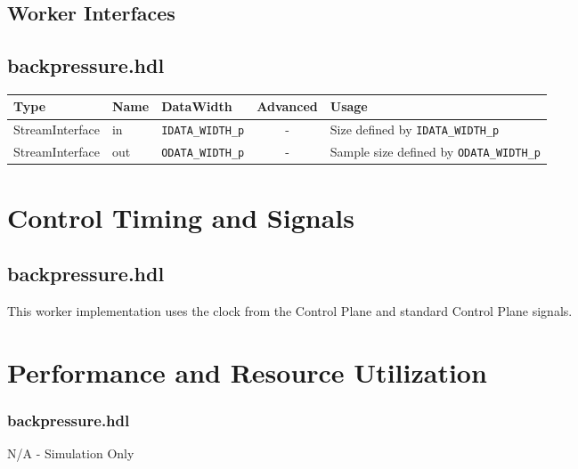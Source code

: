 \documentclass{article}
\def\comp{backpressure}
\begin{document}
\begin{landscape}
	\section*{Worker Interfaces}
	\subsection*{\comp.hdl}
	\begin{scriptsize}
		\begin{tabular}{|M{2cm}|M{1.5cm}|M{4cm}|c|M{12cm}|}
			\hline
			Type            & Name & DataWidth            & Advanced & Usage                                       \\
			\hline
			StreamInterface & in   & \verb+IDATA_WIDTH_p+ & -        & Size defined by \verb+IDATA_WIDTH_p+        \\
			\hline
			StreamInterface & out  & \verb+ODATA_WIDTH_p+ & -        & Sample size defined by \verb+ODATA_WIDTH_p+ \\
			\hline
		\end{tabular}
	\end{scriptsize}
\end{landscape}

\section*{Control Timing and Signals}
\subsection*{\comp.hdl}
\begin{flushleft}
	This worker implementation uses the clock from the Control Plane and standard Control Plane signals.
\end{flushleft}

\section*{Performance and Resource Utilization}
\subsubsection*{\comp.hdl}
N/A - Simulation Only
\end{document}
